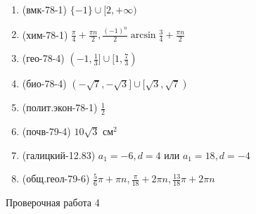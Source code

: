 \documentclass[11pt,a5paper]{report}
\begin{document}
\newpage

\begin{enumerate}
\item (вмк-78-1) $\{-1\}\cup[2,+\infty)$

\item (хим-78-1) $\frac{\pi}{4}+\frac{\pi n}{2}, \frac{(-1)^n}{2}\arcsin\frac{3}{4}+\frac{\pi n}{2}$

\item (гео-78-4) $(-1, \frac{1}{3}] \cup [1, \frac{7}{3})$

\item (био-78-4) $(-\sqrt{7},-\sqrt{3}] \cup [\sqrt{3},\sqrt{7})$

\item (полит.экон-78-1) $\frac{1}{2}$

\item (почв-79-4) $10\sqrt{3}$ см$^2$

\item (галицкий-12.83) $a_1=-6, d=4$ или $a_1=18, d=-4$

\item (общ.геол-79-6) $\frac{5}{6}\pi +\pi n, \frac{\pi}{18}+2\pi n, \frac{13}{18}\pi + 2\pi n$
\end{enumerate}

\newpage

\begin{center}
Проверочная работа 4


\end{center}
\end{document}
